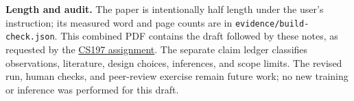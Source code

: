 \documentclass[10pt,letterpaper]{article}
\begin{document}
\textbf{Length and audit.}
The paper is intentionally half length under the user's instruction; its measured
word and page counts are in \texttt{evidence/build-check.json}.
This combined PDF contains the draft followed by these notes, as requested by the
\href{https://web.stanford.edu/class/cs197/assignments/project.html\#draft-paper}{CS197 assignment}.
The separate claim ledger classifies observations, literature, design choices,
inferences, and scope limits. The revised run, human checks, and peer-review
exercise remain future work; no new training or inference was performed for this draft.
\end{document}
